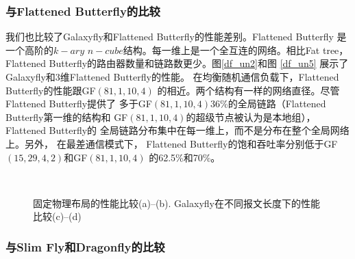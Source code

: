 \subsubsection{与Flattened Butterfly的比较}
我们也比较了Galaxyfly和Flattened Butterfly的性能差别。Flattened Butterfly
是一个高阶的$k-ary$ $n-cube$结构。每一维上是一个全互连的网络。相比Fat tree，
Flattened Butterfly的路由器数量和链路数更少。图\ref{df_un2}和图
\ref{df_un5}
展示了Galaxyfly和3维Flattened Butterfly的性能。
在均衡随机通信负载下，Flattened Butterfly的性能跟GF$(81,1,10,4)$
的相近。两个结构有一样的网络直径。尽管Flattened Butterfly提供了
多于GF$(81,1,10,4)$36\%的全局链路（Flattened Butterfly第一维的结构和
GF$(81,1,10,4)$的超级节点被认为是本地组），Flattened Butterfly的
全局链路分布集中在每一维上，而不是分布在整个全局网络上。另外，
在最差通信模式下，
Flattened Butterfly的饱和吞吐率分别低于GF$(15,29,4,2)$和GF$(81,1,10,4)$
的62.5\%和70\%。


\begin{figure*}[t]
  \centering
    \begin{minipage}[t]{\textwidth}
   \centering
    \\
  \caption{ 固定物理布局的性能比较(a)--(b). Galaxyfly在不同报文长度下的性能比较(c)--(d)}
  \label{fig:Figure12}
  \end{minipage}
\end{figure*}

\subsubsection{与Slim Fly和Dragonfly的比较}

